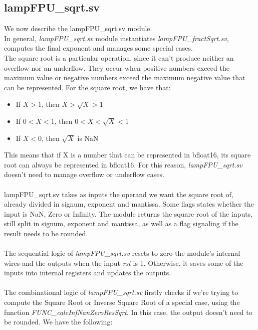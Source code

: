 \subsection{lampFPU\_sqrt.sv}
We now describe the lampFPU\_sqrt.sv module.\\
In general, \emph{lampFPU\_sqrt.sv} module instantiates \emph{lampFPU\_fractSqrt.sv}, computes the final exponent and manages some special cases. \\ 
The square root is a particular operation, since it can't produce neither an overflow nor an underflow. They occur when positive numbers exceed the maximum value or negative numbers exceed the maximum negative value that can be represented. For the square root, we have that:
\begin{itemize}
\item If $X > 1$, then $X > \sqrt{X} > 1$ 
\item If $0 < X < 1$, then $0 < X < \sqrt{X} < 1$
\item If $X < 0$, then $\sqrt{X}$ is NaN
\end{itemize}
This means that if X is a number that can be represented in bfloat16, its square root can always be represented in bfloat16. For this reason, \emph{lampFPU\_sqrt.sv} doesn't need to manage overflow or underflow cases.\\ \\
lampFPU\_sqrt.sv takes as inputs the operand we want the square root of, already divided in signum, exponent and mantissa. Some flags states whether the input is NaN, Zero or Infinity. The module returns the square root of the inputs, still split in signum, exponent and mantissa, as well as a flag signaling if the result needs to be rounded.\\\\
The sequential logic of  \emph{lampFPU\_sqrt.sv} resets to zero the module's internal wires and the outputs when the input \emph{rst} is 1. Otherwise, it saves some of the inputs into internal registers and updates the outputs.\\\\
The combinational logic of \emph{lampFPU\_sqrt.sv} firstly checks if we're trying to compute the Square Root or Inverse Square Root of a special case, using the function \emph{FUNC\_calcInfNanZeroResSqrt}. In this case, the output doesn't need to be rounded. We have the following:
